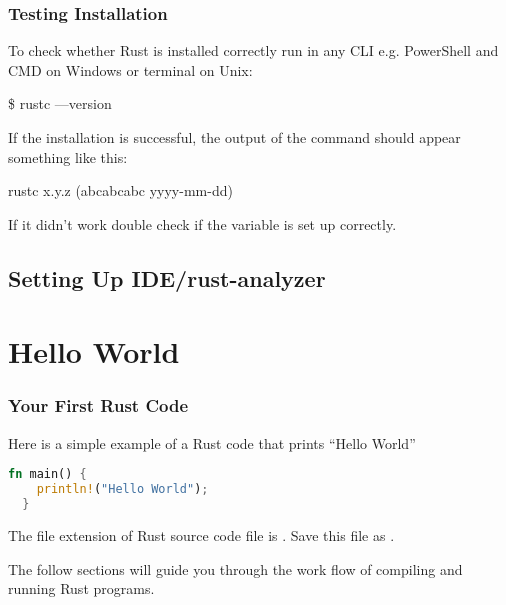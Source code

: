 \documentclass{beamer}
\begin{document}
\begin{frame}[fragile]
  \frametitle{Testing Installation}

  To check whether Rust is installed correctly run in any CLI e.g. PowerShell and CMD on Windows or terminal on Unix:
\begin{semiverbatim}
\$ rustc ---version
\end{semiverbatim}

  If the installation is successful, the output of the command should appear something like this:
\begin{semiverbatim}
rustc x.y.z (abcabcabc yyyy-mm-dd)
\end{semiverbatim}

  If it didn't work double check if the  variable is set up correctly.
\end{frame}

\subsection{Setting Up IDE/rust-analyzer}


\section{Hello World}

\begin{frame}[fragile]
  \frametitle{Your First Rust Code}

  Here is a simple example of a Rust code that prints ``Hello World''
\begin{lstlisting}[language=Rust]
  fn main() {
    println!("Hello World");
  }
\end{lstlisting}

  The file extension of Rust source code file is . Save this file as .

  The follow sections will guide you through the work flow of compiling and running Rust programs.
\end{frame}
\end{document}
